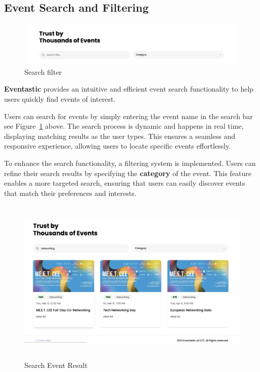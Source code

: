 \subsection{Event Search and Filtering}

\begin{figure}[H]
	\centering	\includegraphics[width=1.0\textwidth,height=80px,frame]{images/search1.png}
	\caption{Search filter}
        \label{fig:search1}
\end{figure}

\textbf{Eventastic} provides an intuitive and efficient event search functionality to help users quickly find events of interest. 

Users can search for events by simply entering the event name in the search bar see Figure~\ref{fig:search1} above. The search process is dynamic and happens in real time, displaying matching results as the user types. This ensures a seamless and responsive experience, allowing users to locate specific events effortlessly.

To enhance the search functionality, a filtering system is implemented. Users can refine their search results by specifying the \textbf{category} of the event. This feature enables a more targeted search, ensuring that users can easily discover events that match their preferences and interests.


\begin{figure}[H]
	\centering	\includegraphics[width=1.0\textwidth,height=300px,frame]{images/search2.png}
	\caption{Search Event Result}
        \label{fig:search2}
\end{figure}


